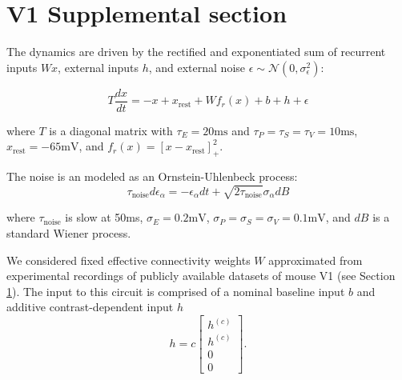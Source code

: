 \documentclass[11pt]{article}
\begin{document}
\section{V1 Supplemental section}\label{methods_V1}

The dynamics are driven by the rectified and exponentiated sum of recurrent inputs $Wx$, external inputs $h$, and external noise $\epsilon \sim \mathcal{N}(0, \sigma_{\epsilon}^2)$:

\begin{equation}
T \frac{dx}{dt} = -x + x_{\text{rest}} +Wf_r(x) + b + h + \epsilon
\end{equation}

where $T$ is a diagonal matrix with $\tau_E = 20\text{ms}$ and $\tau_P = \tau_S = \tau_V = 10\text{ms}$, $x_{\text{rest}} = -65\text{mV}$, and $f_r(x) = \left[x - x_{\text{rest}} \right]_+^2$.

The noise is an modeled as an Ornstein-Uhlenbeck process:
\begin{equation}
\tau_{\text{noise}} d\epsilon_\alpha = -\epsilon_\alpha dt + \sqrt{2\tau_{\text{noise}}}\sigma_\alpha dB
\end{equation}

where $\tau_{\text{noise}}$ is slow at 50ms, $\sigma_E = 0.2\text{mV}$, $\sigma_P = \sigma_S = \sigma_V = 0.1\text{mV}$, and $dB$ is a standard Wiener process.

We considered fixed effective connectivity weights $W$ approximated from experimental recordings of publicly available datasets of mouse V1 \cite{allen2018layer, billeh2019systematic} (see Section \ref{methods_V1}).  The input to this circuit is comprised of a nominal baseline input $b$ and additive contrast-dependent input $h$
\begin{equation}
h = c \begin{bmatrix} h^{(c)} \\ h^{(c)} \\ 0 \\ 0 \end{bmatrix}.
\end{equation}
\end{document}
